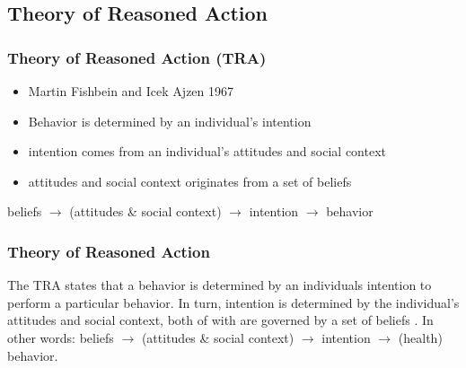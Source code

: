 \documentclass[compress]{beamer}
\begin{document}
\subsection{Theory of Reasoned Action}

    \begin{frame}[Basic2]\frametitle{Theory of Reasoned Action (TRA)}
        \begin{itemize}
            \item Martin Fishbein and Icek Ajzen 1967
            \item Behavior is determined by an individual's intention
            \item intention comes from an individual's attitudes and social context
            \item attitudes and social context originates from a set of beliefs
        \end{itemize}
        
        \vspace{3mm}
        
        beliefs $\rightarrow$ (attitudes \& social context) $\rightarrow$ intention $\rightarrow$ behavior
        
    \end{frame}

    \begin{frame}[Basic2]\frametitle{Theory of Reasoned Action}
        The TRA states that a behavior is determined by an individuals intention to perform a particular behavior.  In turn, intention is determined by the individual's attitudes and social context, both of with are governed by a set of beliefs \cite{Orr2013}.  In other words: beliefs $\rightarrow$ (attitudes \& social context) $\rightarrow$ intention $\rightarrow$ (health) behavior.
    \end{frame}
%    
%    
\end{document}
